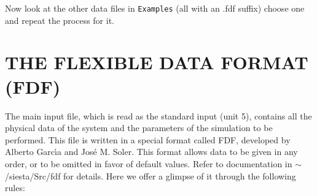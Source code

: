 \documentclass[11pt]{article}
\begin{document}
Now look at the other data files in {\tt Examples}
(all with an .fdf suffix) choose one and repeat the process for it.

\section{THE FLEXIBLE DATA FORMAT (FDF)}

The main input file,
which is read as the standard input (unit 5),
contains all the physical data of the system and the parameters of
the simulation to be performed.
This file is written in a special format called FDF, developed by
Alberto Garc\'{\i}a and Jos\'e M. Soler. This format allows data to be
given in any order, or to be omitted in favor of default values.
Refer to documentation in $\sim$/siesta/Src/fdf for details.
Here we offer a glimpse of it through the following rules:
\end{document}
